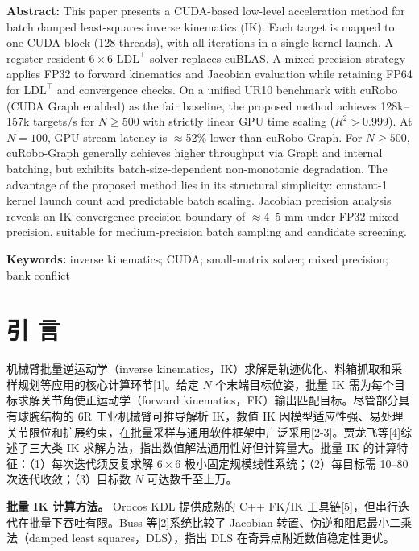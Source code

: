 \documentclass[twocolumn,a4paper,10pt]{ctexart}
\begin{document}
\vspace{2mm}
{\bfseries Abstract:} This paper presents a CUDA-based low-level acceleration method for batch damped least-squares inverse kinematics (IK). Each target is mapped to one CUDA block (128 threads), with all iterations in a single kernel launch. A register-resident $6\times6$ $\mathrm{LDL}^\top$ solver replaces cuBLAS. A mixed-precision strategy applies FP32 to forward kinematics and Jacobian evaluation while retaining FP64 for $\mathrm{LDL}^\top$ and convergence checks. On a unified UR10 benchmark with cuRobo (CUDA Graph enabled) as the fair baseline, the proposed method achieves 128k--157k targets/s for $N\ge500$ with strictly linear GPU time scaling ($R^2>0.999$). At $N=100$, GPU stream latency is $\approx$52\% lower than cuRobo-Graph. For $N\ge500$, cuRobo-Graph generally achieves higher throughput via Graph and internal batching, but exhibits batch-size-dependent non-monotonic degradation. The advantage of the proposed method lies in its structural simplicity: constant-1 kernel launch count and predictable batch scaling. Jacobian precision analysis reveals an IK convergence precision boundary of $\approx$4--5 mm under FP32 mixed precision, suitable for medium-precision batch sampling and candidate screening.

\vspace{1mm}
{\bfseries Keywords:} inverse kinematics; CUDA; small-matrix solver; mixed precision; bank conflict

\section{引 言}

机械臂批量逆运动学（inverse kinematics，IK）求解是轨迹优化、料箱抓取和采样规划等应用的核心计算环节[1]。给定 $N$ 个末端目标位姿，批量 IK 需为每个目标求解关节角使正运动学（forward kinematics，FK）输出匹配目标。尽管部分具有球腕结构的 6R 工业机械臂可推导解析 IK，数值 IK 因模型适应性强、易处理关节限位和扩展约束，在批量采样与通用软件框架中广泛采用[2-3]。贾龙飞等[4]综述了三大类 IK 求解方法，指出数值解法通用性好但计算量大。批量 IK 的计算特征：（1）每次迭代须反复求解 $6\times6$ 极小固定规模线性系统；（2）每目标需 10--80 次迭代收敛；（3）目标数 $N$ 可达数千至上万。

{\bfseries 批量 IK 计算方法。} Orocos KDL 提供成熟的 C++ FK/IK 工具链[5]，但串行迭代在批量下吞吐有限。Buss 等[2]系统比较了 Jacobian 转置、伪逆和阻尼最小二乘法（damped least squares，DLS），指出 DLS 在奇异点附近数值稳定性更优。
\end{document}
